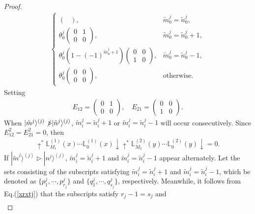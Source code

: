 \documentclass[11pt,reqno]{amsart}
\numberwithin{equation}{section}
\begin{document}
\begin{proof}
\begin{align}
\begin{cases}
\begin{pmatrix}
				\end{pmatrix}, & \tilde{m}_0^{j} = \tilde{n}_0^{j}, \\
				\theta_0^{j}
				\begin{pmatrix}
					0 & 1 \\
					0 & 0
				\end{pmatrix}, & \tilde{m}^{j}_0 = \tilde{n}_0^{j} + 1, \\
				\theta_0^{j}(1 - (-1)^{\tilde{m}_0^{j}+1})
				\begin{pmatrix}
					0 & 0 \\
					1 & 0
				\end{pmatrix}, & \tilde{m}_0^{j} = \tilde{n}_0^{j} - 1, \\
				\theta_0^{j}
				\begin{pmatrix}
					0 & 0 \\
					0 & 0
				\end{pmatrix}, & \text{otherwise}.
			\end{cases}
		\end{align}
		Setting
		\begin{align}
			E_{12}=\begin{pmatrix}
				0 & 1 \\
				0 & 0
			\end{pmatrix}, \quad
			E_{21}=\begin{pmatrix}
				0 & 0 \\
				1 & 0
			\end{pmatrix}.
		\end{align}
		When $|\tilde{m}^{j}\rangle^{(j)} \not\triangleright |\tilde{n}^j \rangle^{(j)} $, $\tilde{m}^{j}_i = \tilde{n}_i^{j} + 1$ or $\tilde{m}_i^{j} = \tilde{n}_i^{j}-1$ will occur consecutively.
		Since $E_{12}^2=E_{21}^2=0$, then
		\begin{align}
			\uparrow^*
			\mathbb{L}_{M_1}^{(1)}(x)\cdots \mathbb{L}_0^{(1)}(x)\downarrow \uparrow^* \mathbb{L}_{M_2}^{(2)}(y)\cdots \mathbb{L}_0^{(2)}(y)
			\downarrow=0.
		\end{align}
		If $|\tilde{m}^{j}\rangle^{(j)} \triangleright |n^j \rangle^{(j)}$, $\tilde{m}^{j}_i = \tilde{n}_i^{j} + 1$ and $\tilde{m}_i^{j} = \tilde{n}_i^{j}-1$ appear alternately.
		Let the sets consisting of the subscripts satisfying $\tilde{m}^{j}_i = \tilde{n}_i^{j} + 1$ and $\tilde{m}_i^{j} = \tilde{n}_i^{j}-1$, which be denoted as  $\{p_1^{j},\cdots,p_{r_j}^{j} \}$ and $\{q_1^{j},\cdots,q_{s_j}^{j} \}$, respectively.
		Meanwhile, it follows from Eq.(\ref{xrxtj}) that the subscripts satisfy  $r_j -1 = s_j$ and
		\begin{align}

\end{align}
\end{proof}
\end{document}
